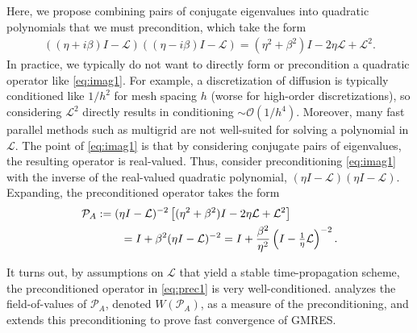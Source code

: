 \documentclass[review]{siamart}
\begin{document}
Here, we propose combining pairs of conjugate eigenvalues into quadratic polynomials
that we must precondition, which take the form 
%
\begin{align}\label{eq:imag1}
((\eta + i\beta)I - \mathcal{L})((\eta - i\beta)I - \mathcal{L}) =
	(\eta^2+\beta^2)I - 2\eta \mathcal{L} + \mathcal{L}^2.
\end{align}
%
In practice, we typically do not want to directly form or precondition a quadratic
operator like \eqref{eq:imag1}. For example, a discretization of diffusion is typically 
conditioned like $1/h^2$ for mesh spacing $h$ (worse for high-order discretizations),
so considering $\mathcal{L}^2$ directly results in conditioning $\sim\mathcal{O}(1/h^4)$.
Moreover, many fast parallel methods such as multigrid are not well-suited for solving
a polynomial in $\mathcal{L}$. The point of \eqref{eq:imag1} is that by considering
conjugate pairs of eigenvalues, the resulting operator is real-valued. Thus, consider
preconditioning \eqref{eq:imag1} with the inverse of the real-valued quadratic polynomial,
$(\eta I - \mathcal{L})(\eta I - \mathcal{L})$. Expanding, the preconditioned operator
takes the form
%
\begin{align}\nonumber
\mathcal{P}_A & := (\eta I - \mathcal{L})^{-2}\left[(\eta^2+\beta^2)I - 2\eta \mathcal{L} + \mathcal{L}^2\right] \\
&\hspace{5ex} = I + \beta^2(\eta I - \mathcal{L})^{-2}
= I + \frac{\beta^2}{\eta^2}\left(I - \tfrac{1}{\eta}\mathcal{L}\right)^{-2}.\label{eq:prec1}
\end{align}
%

It turns out, by assumptions on $\mathcal{L}$ that yield a stable time-propagation scheme,
the preconditioned operator in \eqref{eq:prec1} is very well-conditioned. 
 analyzes the field-of-values of $\mathcal{P}_A$, denoted $W(\mathcal{P}_A)$,
as a measure of the preconditioning, and  extends this preconditioning to
prove fast convergence of GMRES. 
\end{document}
